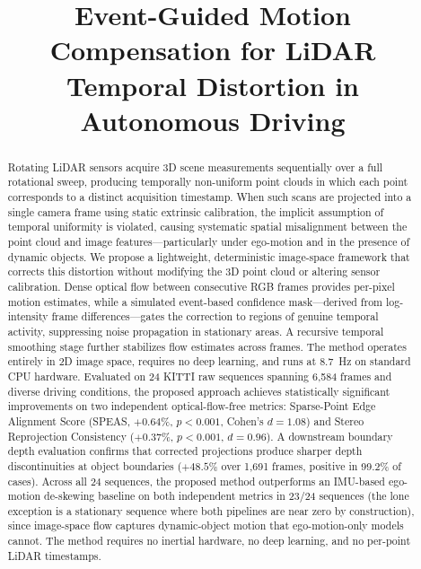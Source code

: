 \documentclass[conference]{IEEEtran}
\title{Event-Guided Motion Compensation for LiDAR\\
Temporal Distortion in Autonomous Driving}
\author{
\IEEEauthorblockN{Sahal Ansar Theparambil}
\IEEEauthorblockA{Department of Engineering\\
Indian Institute of Information Technology Sri City, India\\
sahalansar.t23@iiits.in}
}
\begin{document}
\maketitle

\begin{abstract}
Rotating LiDAR sensors acquire 3D scene measurements sequentially
over a full rotational sweep, producing temporally non-uniform point
clouds in which each point corresponds to a distinct acquisition
timestamp. When such scans are projected into a single camera frame
using static extrinsic calibration, the implicit assumption of
temporal uniformity is violated, causing systematic spatial
misalignment between the point cloud and image
features---particularly under ego-motion and in the presence of
dynamic objects. We propose a lightweight, deterministic image-space
framework that corrects this distortion without modifying the 3D
point cloud or altering sensor calibration. Dense optical flow
between consecutive RGB frames provides per-pixel motion estimates,
while a simulated event-based confidence mask---derived from
log-intensity frame differences---gates the correction to regions of
genuine temporal activity, suppressing noise propagation in
stationary areas. A recursive temporal smoothing stage further
stabilizes flow estimates across frames. The method operates
entirely in 2D image space, requires no deep learning, and runs at
8.7~Hz on standard CPU hardware. Evaluated on 24 KITTI raw
sequences spanning 6{,}584 frames and diverse driving conditions,
the proposed approach achieves statistically significant improvements
on two independent optical-flow-free metrics: Sparse-Point Edge
Alignment Score (SPEAS, $+0.64\%$, $p{<}0.001$, Cohen's
$d{=}1.08$) and Stereo Reprojection Consistency ($+0.37\%$,
$p{<}0.001$, $d{=}0.96$). A downstream boundary depth evaluation
confirms that corrected projections produce sharper depth
discontinuities at object boundaries ($+48.5\%$ over 1{,}691
frames, positive in 99.2\% of cases). Across all 24 sequences,
the proposed method outperforms an IMU-based ego-motion de-skewing
baseline on both independent metrics in 23/24 sequences (the lone
exception is a stationary sequence where both pipelines are near
zero by construction), since image-space flow captures
dynamic-object motion that ego-motion-only models cannot. The
method requires no inertial hardware, no deep learning, and no
per-point LiDAR timestamps.
\end{abstract}
\end{document}
